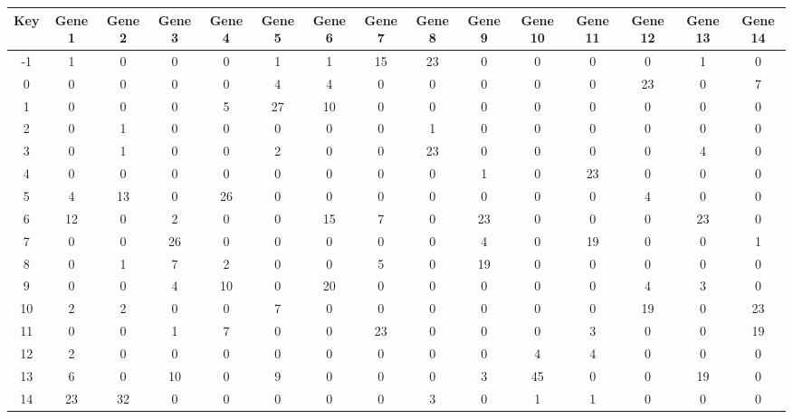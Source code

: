 \begin{tabular}{|c|c|c|c|c|c|c|c|c|c|c|c|c|c|c|}
\hline
Key & Gene 1 & Gene 2 & Gene 3 & Gene 4 & Gene 5 & Gene 6 & Gene 7 & Gene 8 & Gene 9 & Gene 10 & Gene 11 & Gene 12 & Gene 13 & Gene 14 \\
\hline
-1 & 1 & 0 & 0 & 0 & 1 & 1 & 15 & 23 & 0 & 0 & 0 & 0 & 1 & 0 \\
0 & 0 & 0 & 0 & 0 & 4 & 4 & 0 & 0 & 0 & 0 & 0 & 23 & 0 & 7 \\
1 & 0 & 0 & 0 & 5 & 27 & 10 & 0 & 0 & 0 & 0 & 0 & 0 & 0 & 0 \\
2 & 0 & 1 & 0 & 0 & 0 & 0 & 0 & 1 & 0 & 0 & 0 & 0 & 0 & 0 \\
3 & 0 & 1 & 0 & 0 & 2 & 0 & 0 & 23 & 0 & 0 & 0 & 0 & 4 & 0 \\
4 & 0 & 0 & 0 & 0 & 0 & 0 & 0 & 0 & 1 & 0 & 23 & 0 & 0 & 0 \\
5 & 4 & 13 & 0 & 26 & 0 & 0 & 0 & 0 & 0 & 0 & 0 & 4 & 0 & 0 \\
6 & 12 & 0 & 2 & 0 & 0 & 15 & 7 & 0 & 23 & 0 & 0 & 0 & 23 & 0 \\
7 & 0 & 0 & 26 & 0 & 0 & 0 & 0 & 0 & 4 & 0 & 19 & 0 & 0 & 1 \\
8 & 0 & 1 & 7 & 2 & 0 & 0 & 5 & 0 & 19 & 0 & 0 & 0 & 0 & 0 \\
9 & 0 & 0 & 4 & 10 & 0 & 20 & 0 & 0 & 0 & 0 & 0 & 4 & 3 & 0 \\
10 & 2 & 2 & 0 & 0 & 7 & 0 & 0 & 0 & 0 & 0 & 0 & 19 & 0 & 23 \\
11 & 0 & 0 & 1 & 7 & 0 & 0 & 23 & 0 & 0 & 0 & 3 & 0 & 0 & 19 \\
12 & 2 & 0 & 0 & 0 & 0 & 0 & 0 & 0 & 0 & 4 & 4 & 0 & 0 & 0 \\
13 & 6 & 0 & 10 & 0 & 9 & 0 & 0 & 0 & 3 & 45 & 0 & 0 & 19 & 0 \\
14 & 23 & 32 & 0 & 0 & 0 & 0 & 0 & 3 & 0 & 1 & 1 & 0 & 0 & 0 \\
\hline
\end{tabular}